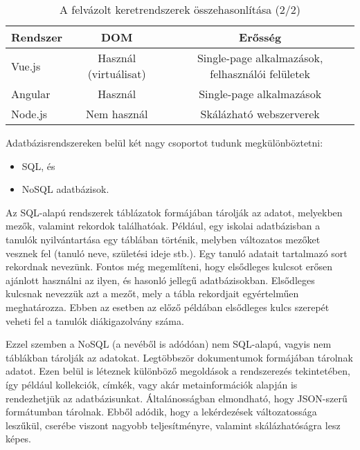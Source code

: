 \begin{table}[h]
\centering
\caption{A felvázolt keretrendszerek összehasonlítása (2/2)}
\label{tab:minta}
\begin{tabular}{|l|c|c|}
\hline
Rendszer & DOM & Erősség\\
\hline
Vue.js & Használ (virtuálisat) & Single-page alkalmazások, felhasználói felületek\\
\hline
Angular & Használ & Single-page alkalmazások\\
\hline
Node.js & Nem használ & Skálázható webszerverek\\
\hline
\end{tabular}
\end{table}



Adatbázisrendszereken belül két nagy csoportot tudunk megkülönböztetni:
\begin{itemize}
\item SQL, és
\item NoSQL adatbázisok.
\end{itemize}
Az SQL-alapú rendszerek táblázatok formájában tárolják az adatot, melyekben mezők, valamint rekordok találhatóak. Például, egy iskolai adatbázisban a tanulók nyilvántartása egy táblában történik, melyben változatos mezőket vesznek fel (tanuló neve, születési ideje stb.). Egy tanuló adatait tartalmazó sort rekordnak nevezünk. Fontos még megemlíteni, hogy elsődleges kulcsot erősen ajánlott használni az ilyen, és hasonló jellegű adatbázisokban. Elsődleges kulcsnak nevezzük azt a mezőt, mely a tábla rekordjait egyértelműen meghatározza. Ebben az esetben az előző példában elsődleges kulcs szerepét veheti fel a tanulók diákigazolvány száma.

Ezzel szemben a NoSQL (a nevéből is adódóan) nem SQL-alapú, vagyis nem táblákban tárolják az adatokat. Legtöbbször dokumentumok formájában tárolnak adatot. Ezen belül is léteznek különböző megoldások a rendszerezés tekintetében, így például kollekciók, címkék, vagy akár metainformációk alapján is rendezhetjük az adatbázisunkat. Általánosságban elmondható, hogy JSON-szerű formátumban tárolnak. Ebből adódik, hogy a lekérdezések változatossága leszűkül, cserébe viszont nagyobb teljesítményre, valamint skálázhatóságra lesz képes.

